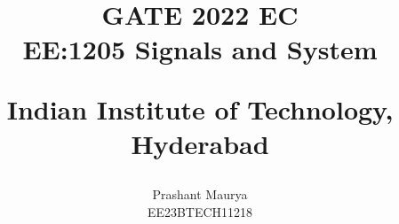 \documentclass[journal,12pt,twocolumn]{IEEEtran}
\theoremstyle{remark}
\begin{document}
%




\vspace{3cm}

\title{
GATE 2022 EC\\
\large{EE:1205 Signals and System}

Indian Institute of Technology, Hyderabad
}
\author{Prashant Maurya

EE23BTECH11218
}	


%
%
%

% 
%



% 
\end{document}
